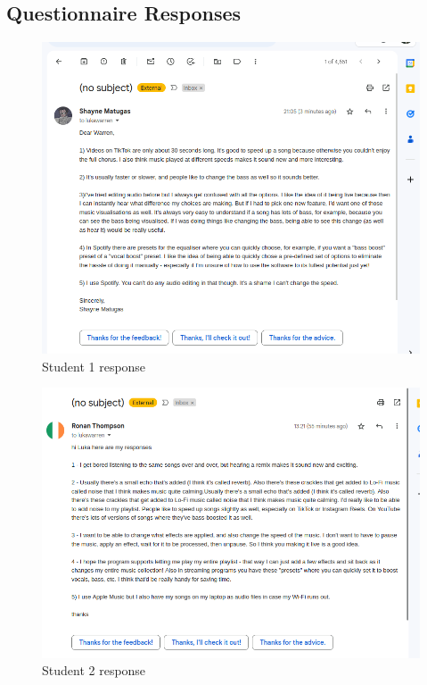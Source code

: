 \documentclass{article}
\begin{document}
	\subsection{Questionnaire Responses}
	\begin{figure}[H]
		\includegraphics[width=14cm]{./shayne interview.png}
		\caption{Student 1 response}
	\end{figure}
	\begin{figure}[H]
		\includegraphics[width=14cm]{./ronan interview.png}
		\caption{Student 2 response}
	\end{figure}
\end{document}
